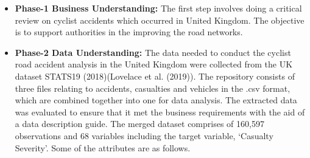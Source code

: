 \documentclass[
  a4paper,
]{article}
\begin{document}
\begin{itemize}
\item
  \textbf{Phase-1 Business Understanding:} The first step involves doing
  a critical review on cyclist accidents which occurred in United
  Kingdom. The objective is to support authorities in the improving the
  road networks.
\item
  \textbf{Phase-2 Data Understanding:} The data needed to conduct the
  cyclist road accident analysis in the United Kingdom were collected
  from the UK dataset STATS19 (2018)(Lovelace et al. (2019)). The
  repository consists of three files relating to accidents, casualties
  and vehicles in the .csv format, which are combined together into one
  for data analysis. The extracted data was evaluated to ensure that it
  met the business requirements with the aid of a data description
  guide. The merged dataset comprises of 160,597 observations and 68
  variables including the target variable, `Casualty Severity'. Some of
  the attributes are as follows.


\end{itemize}
\end{document}
